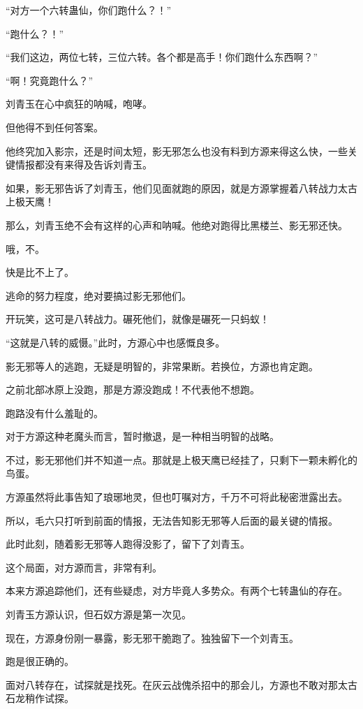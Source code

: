 \begin{this_body}
“对方一个六转蛊仙，你们跑什么？！”

“跑什么？！”

“我们这边，两位七转，三位六转。各个都是高手！你们跑什么东西啊？”

“啊！究竟跑什么？”

刘青玉在心中疯狂的呐喊，咆哮。

但他得不到任何答案。

他终究加入影宗，还是时间太短，影无邪怎么也没有料到方源来得这么快，一些关键情报都没有来得及告诉刘青玉。

如果，影无邪告诉了刘青玉，他们见面就跑的原因，就是方源掌握着八转战力太古上极天鹰！

那么，刘青玉绝不会有这样的心声和呐喊。他绝对跑得比黑楼兰、影无邪还快。

哦，不。

快是比不上了。

逃命的努力程度，绝对要搞过影无邪他们。

开玩笑，这可是八转战力。碾死他们，就像是碾死一只蚂蚁！

“这就是八转的威慑。”此时，方源心中也感慨良多。

影无邪等人的逃跑，无疑是明智的，非常果断。若换位，方源也肯定跑。

之前北部冰原上没跑，那是方源没跑成！不代表他不想跑。

跑路没有什么羞耻的。

对于方源这种老魔头而言，暂时撤退，是一种相当明智的战略。

不过，影无邪他们并不知道一点。那就是上极天鹰已经挂了，只剩下一颗未孵化的鸟蛋。

方源虽然将此事告知了琅琊地灵，但也叮嘱对方，千万不可将此秘密泄露出去。

所以，毛六只打听到前面的情报，无法告知影无邪等人后面的最关键的情报。

此时此刻，随着影无邪等人跑得没影了，留下了刘青玉。

这个局面，对方源而言，非常有利。

本来方源追踪他们，还有些疑虑，对方毕竟人多势众。有两个七转蛊仙的存在。

刘青玉方源认识，但石奴方源是第一次见。

现在，方源身份刚一暴露，影无邪干脆跑了。独独留下一个刘青玉。

跑是很正确的。

面对八转存在，试探就是找死。在灰云战傀杀招中的那会儿，方源也不敢对那太古石龙稍作试探。


\end{this_body}
